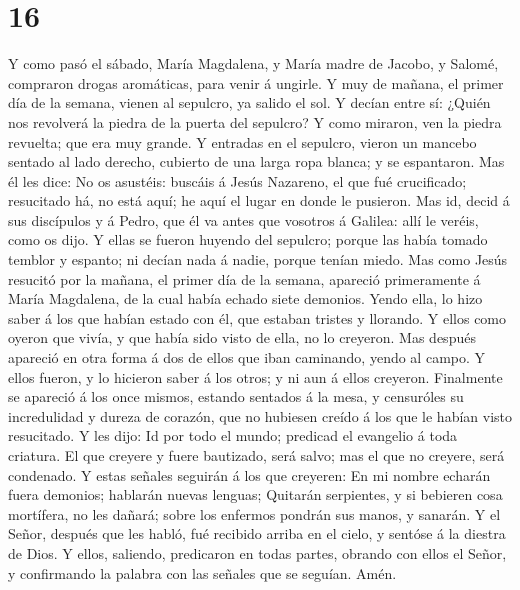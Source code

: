 \hypertarget{section-15}{%
\section{16}\label{section-15}}

 Y como pasó el sábado, María Magdalena, y María madre de
Jacobo, y Salomé, compraron drogas aromáticas, para venir á ungirle.
 Y muy de mañana, el primer día de la semana, vienen al
sepulcro, ya salido el sol.  Y decían entre sí: ¿Quién nos
revolverá la piedra de la puerta del sepulcro?  Y como
miraron, ven la piedra revuelta; que era muy grande.  Y
entradas en el sepulcro, vieron un mancebo sentado al lado derecho,
cubierto de una larga ropa blanca; y se espantaron.  Mas él
les dice: No os asustéis: buscáis á Jesús Nazareno, el que fué
crucificado; resucitado há, no está aquí; he aquí el lugar en donde le
pusieron.  Mas id, decid á sus discípulos y á Pedro, que él
va antes que vosotros á Galilea: allí le veréis, como os dijo.
 Y ellas se fueron huyendo del sepulcro; porque las había
tomado temblor y espanto; ni decían nada á nadie, porque tenían miedo.
 Mas como Jesús resucitó por la mañana, el primer día de la
semana, apareció primeramente á María Magdalena, de la cual había echado
siete demonios.  Yendo ella, lo hizo saber á los que habían
estado con él, que estaban tristes y llorando.  Y ellos
como oyeron que vivía, y que había sido visto de ella, no lo creyeron.
 Mas después apareció en otra forma á dos de ellos que iban
caminando, yendo al campo.  Y ellos fueron, y lo hicieron
saber á los otros; y ni aun á ellos creyeron.  Finalmente
se apareció á los once mismos, estando sentados á la mesa, y censuróles
su incredulidad y dureza de corazón, que no hubiesen creído á los que le
habían visto resucitado.  Y les dijo: Id por todo el mundo;
predicad el evangelio á toda criatura.  El que creyere y
fuere bautizado, será salvo; mas el que no creyere, será condenado.
 Y estas señales seguirán á los que creyeren: En mi nombre
echarán fuera demonios; hablarán nuevas lenguas;  Quitarán
serpientes, y si bebieren cosa mortífera, no les dañará; sobre los
enfermos pondrán sus manos, y sanarán.  Y el Señor, después
que les habló, fué recibido arriba en el cielo, y sentóse á la diestra
de Dios.  Y ellos, saliendo, predicaron en todas partes,
obrando con ellos el Señor, y confirmando la palabra con las señales que
se seguían. Amén.
